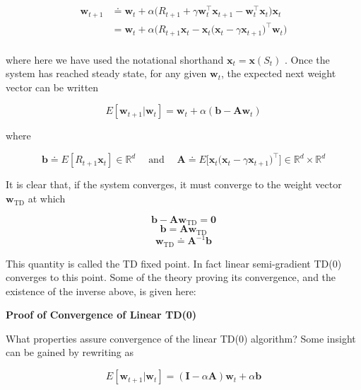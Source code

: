 \documentclass{article}
\begin{document}
$$
\begin{aligned} { \mathbf { w } _ { t + 1 } } & { { } \doteq \mathbf { w } _ { t } + \alpha \Big ( R _ { t + 1 } + \gamma \mathbf { w } _ { t } ^ { \top } \mathbf { x } _ { t + 1 } - \mathbf { w } _ { t } ^ { \top } \mathbf { x } _ { t } \Big ) \mathbf { x } _ { t } } \\ { } & { { } = \mathbf { w } _ { t } + \alpha \Big ( R _ { t + 1 } \mathbf { x } _ { t } - \mathbf { x } _ { t } \big ( \mathbf { x } _ { t } - \gamma \mathbf { x } _ { t + 1 } \big ) ^ { \top } \mathbf { w } _ { t } \Big ) } \\ \end{aligned}
$$

where here we have used the notational shorthand $\mathbf { x } _ { t } = \mathbf { x } ( S _ { t } )$ . Once the system has reached steady state, for any given $\mathbf { w } _ { t }$, 
the expected next weight vector can be written

$$
E [ \mathbf { w } _ { t + 1 } | \mathbf { w } _ { t } ] = \mathbf { w } _ { t } + \alpha ( \mathbf { b } - \mathbf { A } \mathbf { w } _ { t } )
$$

where

$$
\mathbf { b } \doteq E [ R _ { t + 1 } \mathbf { x } _ { t } ] \in \mathbb { R } ^ { d } \quad \operatorname { a n d } \quad \mathbf { A } \doteq E \Big [ \mathbf { x } _ { t } \big ( \mathbf { x } _ { t } - \gamma \mathbf { x } _ { t + 1 } \big ) ^ { \top } \Big ] \in \mathbb { R } ^ { d } \times \mathbb { R } ^ { d }
$$

It is clear that, if the system converges, it must converge to the weight vector $\mathbf { w } _ { \mathrm { T D } }$ at which

$$
\mathbf { b } - \mathbf { A } \mathbf { w } _ { \operatorname { T D } } = \mathbf { 0 }
$$
$$
\mathbf { b } = \mathbf { A } \mathbf { w } _ { \operatorname { T D } }
$$
$$
\mathbf { w } _ { \operatorname { T D } } \doteq \mathbf { A } ^ { - 1 } \mathbf { b }
$$

This quantity is called the TD fixed point. In fact linear semi-gradient TD(0) converges to this point. Some of the theory proving its convergence, and the existence of the inverse above, is given here:

\textbf{Proof of Convergence of Linear TD(0)}

What properties assure convergence of the linear TD(0) algorithm? Some insight can be gained by rewriting as

$$
E [ \mathbf { w } _ { t + 1 } | \mathbf { w } _ { t } ] = ( \mathbf { I } - \alpha \mathbf { A } ) \mathbf { w } _ { t } + \alpha \mathbf { b }
$$
\end{document}
